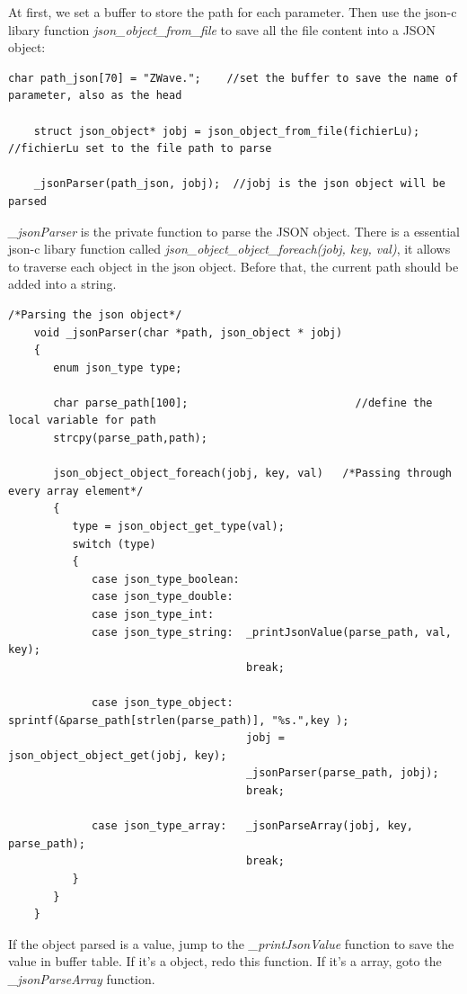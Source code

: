 At first, we set a buffer to store the path for each parameter. Then use the json-c libary function \textit{json_object_from_file} to save all the file content into a JSON object:

\begin{lstlisting}[mathescape]
    char path_json[70] = "ZWave.";    //set the buffer to save the name of parameter, also as the head

    struct json_object* jobj = json_object_from_file(fichierLu);  //fichierLu set to the file path to parse

    _jsonParser(path_json, jobj);  //jobj is the json object will be parsed
\end{lstlisting}


\textit{_jsonParser} is the private function to parse the JSON object. There is a essential json-c libary function called \textit{json_object_object_foreach(jobj, key, val)}, it allows to traverse each object in the json object. Before that, the current path should be added into a string.

\begin{lstlisting}[mathescape]
    /*Parsing the json object*/
    void _jsonParser(char *path, json_object * jobj)
    {
       enum json_type type;

       char parse_path[100];                          //define the local variable for path
       strcpy(parse_path,path);

       json_object_object_foreach(jobj, key, val)   /*Passing through every array element*/
       {
          type = json_object_get_type(val);
          switch (type)
          {
             case json_type_boolean:
             case json_type_double:
             case json_type_int:
             case json_type_string:  _printJsonValue(parse_path, val, key);
                                     break;

             case json_type_object:  sprintf(&parse_path[strlen(parse_path)], "%s.",key );
                                     jobj = json_object_object_get(jobj, key);
                                     _jsonParser(parse_path, jobj);
                                     break;

             case json_type_array:   _jsonParseArray(jobj, key, parse_path);
                                     break;
          }
       }
    }
\end{lstlisting}

If the object parsed is a value, jump to the \textit{_printJsonValue} function to save the value in buffer table. If it's a object, redo this function. If it's a array, goto the \textit{_jsonParseArray} function.

